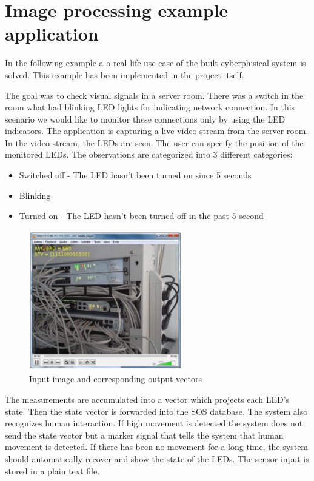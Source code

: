 \section{Image processing example application}

In the following example a a real life use case of the built cyberphisical system is solved. This example has been implemented in the project itself\cite{g6d1}. 

The goal was to check visual signals in a server room. There was a switch in the room what had blinking LED lights for indicating network connection. In this scenario we would like to monitor these connections only by using the LED indicators. The application is capturing a live video stream from the server room. In the video stream, the LEDs are seen. The user can specify the position of the monitored LEDs. The observations are categorized into 3 different categories:
\begin{itemize}
	\item Switched off - The LED hasn't been turned on since 5 seconds
	\item Blinking
	\item Turned on - The LED hasn't been turned off in the past 5 second
\end{itemize}

\begin{figure}[h]
	\centering
	\includegraphics[width=0.6\textwidth]{figures/switchwork.png}
	\caption{Input image and corresponding output vectors\label{fig:switchwork}}
\end{figure}

The measurements are accumulated into a vector which projects each LED's state. Then the state vector is forwarded into the SOS database. The system also recognizes human interaction. If high movement is detected the system does not send the state vector but a marker signal that tells the system that human movement is detected. If there has been no movement for a long time, the system should automatically recover and show the state of the LEDs. The sensor input is stored in a plain text file.

